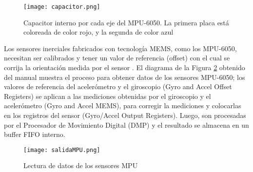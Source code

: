 \begin{figure}[htb]
	\centering
	\texttt{[image: capacitor.png]}
	\caption{Capacitor interno por cada eje del MPU-6050. La primera placa está coloreada de color rojo, y la segunda de color azul}
	\label{fig:capacitor}
\end{figure}

Los sensores inerciales fabricados con tecnología MEMS, como los MPU-6050, necesitan ser calibrados y tener un valor de referencia (offset) con el cual se corrija la orientación medida por el sensor \cite{offsetMPU}. El diagrama de la Figura \ref{fig:salidaMPU} obtenido del manual \cite{offsetMPU} muestra el proceso para obtener datos de los sensores MPU-6050; los valores de referencia del acelerómetro y el giroscopio (Gyro and Accel Offset Registers) se aplican a las mediciones obtenidas por el giroscopio y el acelerómetro (Gyro and Accel MEMS), para corregir la mediciones y colocarlas en los registros del sensor (Gyro/Accel Output Registers). Luego, son procesadas por el Procesador de Movimiento Digital (DMP) y el resultado se almacena en un buffer FIFO interno.

\begin{figure}[htb]
	\centering
	\texttt{[image: salidaMPU.png]}
	\caption{Lectura de datos de los sensores MPU}
	\label{fig:salidaMPU}
\end{figure}



